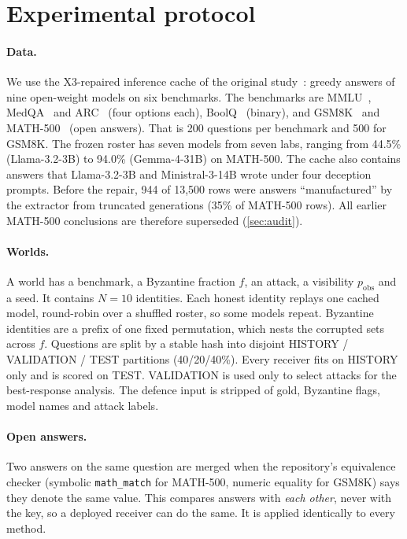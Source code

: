 \section{Experimental protocol}\label{sec:protocol}

\paragraph{Data.} We use the X3-repaired inference cache of the original study~\citep{das2026aip}: greedy answers of nine open-weight models on six benchmarks. The benchmarks are MMLU~\citep{hendrycks2021mmlu}, MedQA~\citep{jin2021medqa} and ARC~\citep{clark2018arc} (four options each), BoolQ~\citep{clark2019boolq} (binary), and GSM8K~\citep{cobbe2021gsm8k} and MATH-500~\citep{hendrycks2021math,lightman2023verify} (open answers). That is 200 questions per benchmark and 500 for GSM8K. The frozen roster has seven models from seven labs, ranging from 44.5\% (Llama-3.2-3B) to 94.0\% (Gemma-4-31B) on MATH-500. The cache also contains answers that Llama-3.2-3B and Ministral-3-14B wrote under four deception prompts. Before the repair, 944 of 13{,}500 rows were answers ``manufactured'' by the extractor from truncated generations (35\% of MATH-500 rows). All earlier MATH-500 conclusions are therefore superseded (\cref{sec:audit}).

\paragraph{Worlds.} A world has a benchmark, a Byzantine fraction $f$, an attack, a visibility $p_{\text{obs}}$ and a seed. It contains $N=10$ identities. Each honest identity replays one cached model, round-robin over a shuffled roster, so some models repeat. Byzantine identities are a prefix of one fixed permutation, which nests the corrupted sets across $f$. Questions are split by a stable hash into disjoint HISTORY / VALIDATION / TEST partitions (40/20/40\%). Every receiver fits on HISTORY only and is scored on TEST. VALIDATION is used only to select attacks for the best-response analysis. The defence input is stripped of gold, Byzantine flags, model names and attack labels.

\paragraph{Open answers.} Two answers on the same question are merged when the repository's equivalence checker (symbolic \texttt{math\_match} for MATH-500, numeric equality for GSM8K) says they denote the same value. This compares answers with \emph{each other}, never with the key, so a deployed receiver can do the same. It is applied identically to every method.

